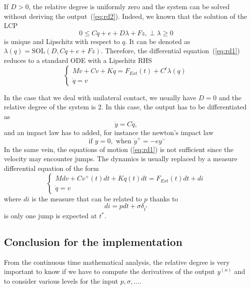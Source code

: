 If $D>0$, the relative degree is uniformly zero and the system can be solved without deriving the output~(\ref{eq:rd2}). Indeed, we known that the solution of the LCP
\begin{equation}
  0\leq Cq + e + D \lambda + Fz, \perp \lambda \geq 0
\label{eq:rd5}
\end{equation}
is unique and Lipschitz with respect to $q$. It can be denoted as $\lambda(q) = \mbox{SOL}(D,Cq + e +Fz)$. Therefore, the differential equation~(\ref{eq:rd1}) reduces to a standard ODE with a Lipschitz RHS
 \begin{equation}
  \label{eq:rd6}
  \begin{cases}
    M \dot v + C v + K q = F_{Ext}(t) + C^t \lambda(q)  \\
    \dot q = v
  \end{cases}
\end{equation}

In the case that we deal with unilateral contact, we usually have $D=0$ and the relative degree of the system is $2$. In this case, the output has to be differentiated as
\begin{equation}
  \label{eq:rd7}
   \dot y= C \dot q,
\end{equation}
and an impact law has to added, for instance the newton's impact law
\begin{equation}
  \label{eq:rd8}
  \text{ if } y=0, \text{ when } \dot y^+= -e y^-
\end{equation}
In the same vein, the equations of motion (\ref{eq:rd1}) is not sufficient since the velocity may encounter jumps. The dynamics is usually replaced by a measure differential equation of the form
\begin{equation}
  \label{eq:rd10}
  \begin{cases}
    M dv + C v^+(t) dt + K q(t) dt = F_{Ext}(t)dt + di \\
    \dot q = v
  \end{cases}
\end{equation}
where $di$ is the measure that can be related to $p$ thanks to
\begin{equation}
  \label{eq:rd11}
  di = p dt + \sigma \delta _{t^*}
\end{equation}
is only one jump is expected at ${t^*}$.


\subsection{Conclusion for the implementation}
From the continuous time mathematical analysis, the relative degree is very important to know if we have to compute the derivatives of the output $y^{(n)}$ and to consider various levels for the input $p , \sigma, ....$


